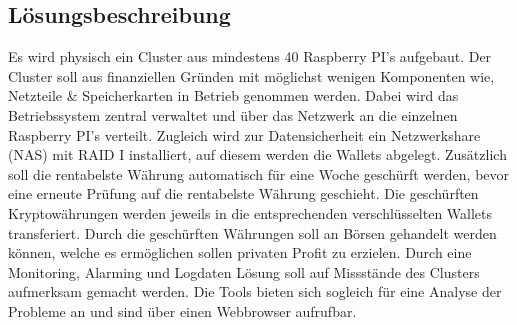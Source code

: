 
\subsection{Lösungsbeschreibung}
Es wird physisch ein Cluster aus mindestens 40 Raspberry PI's aufgebaut. Der Cluster soll aus finanziellen Gründen mit möglichst wenigen Komponenten wie, Netzteile \& Speicherkarten in Betrieb genommen werden. Dabei wird das Betriebssystem zentral verwaltet und über das Netzwerk an die einzelnen Raspberry PI's verteilt. Zugleich wird zur Datensicherheit ein Netzwerkshare (NAS) mit RAID I installiert, auf diesem werden die Wallets abgelegt. Zusätzlich soll die rentabelste Währung automatisch für eine Woche geschürft werden, bevor eine erneute Prüfung auf die rentabelste Währung geschieht. Die geschürften Kryptowährungen werden jeweils in die entsprechenden verschlüsselten Wallets transferiert. Durch die geschürften Währungen soll an Börsen gehandelt werden können, welche es ermöglichen sollen privaten Profit zu erzielen. Durch eine Monitoring, Alarming und Logdaten Lösung soll auf Missstände des Clusters aufmerksam gemacht werden. Die Tools bieten sich sogleich für eine Analyse der Probleme an und sind über einen Webbrowser aufrufbar.   